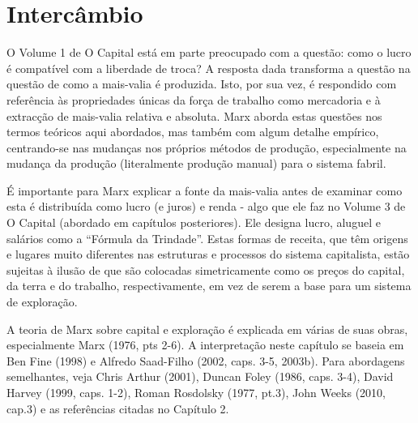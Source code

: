 \section{Intercâmbio}
 \par 
O Volume {\color{blue}1} de O Capital está em parte preocupado com a questão: como o lucro é compatível com a liberdade de troca? A resposta dada transforma a questão na questão de como a mais-valia é produzida. Isto, por sua vez, é respondido com referência às propriedades únicas da força de trabalho como mercadoria e à extracção de mais-valia relativa e absoluta. Marx aborda estas questões nos termos teóricos aqui abordados, mas também com algum detalhe empírico, centrando-se nas mudanças nos próprios métodos de produção, especialmente na mudança da produção (literalmente produção manual) para o sistema fabril.
 \par 
É importante para Marx explicar a fonte da mais-valia antes de examinar como esta é distribuída como lucro (e juros) e renda - algo que ele faz no Volume {\color{blue}3} de O Capital (abordado em capítulos posteriores). Ele designa lucro, aluguel e salários como a “Fórmula da Trindade”. Estas formas de receita, que têm origens e lugares muito diferentes nas estruturas e processos do sistema capitalista, estão sujeitas à ilusão de que são colocadas simetricamente como os preços do capital, da terra e do trabalho, respectivamente, em vez de serem a base para um sistema de exploração.
 \par 
A teoria de Marx sobre capital e exploração é explicada em várias de suas obras, especialmente Marx (1976, pts 2-6). A interpretação neste capítulo se baseia em Ben Fine (1998) e Alfredo Saad-Filho (2002, caps. 3-5, 2003b). Para abordagens semelhantes, veja Chris Arthur (2001), Duncan Foley (1986, caps. 3-4), David Harvey (1999, caps. 1-2), Roman Rosdolsky (1977, pt.{\color{blue}3}), John Weeks (2010, cap.{\color{blue}3}) e as referências citadas no Capítulo {\color{blue}2}.
 \par 

